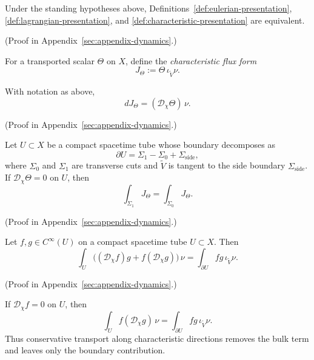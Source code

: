 \begin{proposition}
\label{prop:observer-triad}
Under the standing hypotheses above, Definitions~\ref{def:eulerian-presentation},
\ref{def:lagrangian-presentation}, and
\ref{def:characteristic-presentation} are equivalent.
\end{proposition}

(Proof in Appendix~\ref{sec:appendix-dynamics}.)

\begin{definition}
\label{def:characteristic-flux-form}
For a transported scalar $\Theta$ on $X$, define the \emph{characteristic flux
form}
\[
J_\Theta := \Theta \,\iota_{\widetilde V}\nu.
\]
\end{definition}

\begin{lemma}
\label{lem:flux-differential}
With notation as above,
\[
dJ_\Theta = (\mathcal D_\chi \Theta)\,\nu.
\]
\end{lemma}

(Proof in Appendix~\ref{sec:appendix-dynamics}.)

\begin{theorem}
\label{thm:cut-conservation}
Let $U \subset X$ be a compact spacetime tube whose boundary decomposes as
\[
\partial U = \Sigma_1 - \Sigma_0 + \Sigma_{\mathrm{side}},
\]
where $\Sigma_0$ and $\Sigma_1$ are transverse cuts and
$\widetilde V$ is tangent to the side boundary
$\Sigma_{\mathrm{side}}$. If $\mathcal D_\chi \Theta = 0$ on $U$, then
\[
\int_{\Sigma_1} J_\Theta = \int_{\Sigma_0} J_\Theta.
\]
\end{theorem}

(Proof in Appendix~\ref{sec:appendix-dynamics}.)

\begin{theorem}
\label{thm:characteristic-ibp}
Let $f,g \in C^\infty(U)$ on a compact spacetime tube $U \subset X$. Then
\[
\int_U \bigl((\mathcal D_\chi f)g + f(\mathcal D_\chi g)\bigr)\,\nu
=
\int_{\partial U} fg\,\iota_{\widetilde V}\nu.
\]
\end{theorem}

(Proof in Appendix~\ref{sec:appendix-dynamics}.)

\begin{corollary}
\label{cor:characteristic-boundary-reduction}
If $\mathcal D_\chi f = 0$ on $U$, then
\[
\int_U f(\mathcal D_\chi g)\,\nu
=
\int_{\partial U} fg\,\iota_{\widetilde V}\nu.
\]
Thus conservative transport along characteristic directions removes the bulk
term and leaves only the boundary contribution.
\end{corollary}

